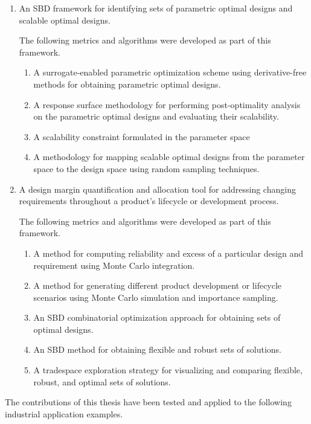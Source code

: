 \begin{enumerate}
	\item{An \ac{SBD} framework for identifying sets of parametric optimal designs and scalable optimal designs.}
	
	The following metrics and algorithms were developed as part of this framework.
	
	\begin{enumerate}
		\item{A surrogate-enabled parametric optimization scheme using derivative-free methods for obtaining parametric optimal designs.}
		\item{A response surface methodology for performing post-optimality analysis on the parametric optimal designs and evaluating their scalability.}
		\item{A scalability constraint formulated in the parameter space}
		\item{A methodology for mapping scalable optimal designs from the parameter space to the design space using random sampling techniques.}
	\end{enumerate}
	\item{A design margin quantification and allocation tool for addressing changing requirements throughout a product's lifecycle or development process.}
	
	The following metrics and algorithms were developed as part of this framework.
	
	\begin{enumerate}
		\item{A method for computing reliability and excess of a particular design and requirement using Monte Carlo integration.}
		\item{A method for generating different product development or lifecycle scenarios using Monte Carlo simulation and importance sampling.}
		\item{An \ac{SBD} combinatorial optimization approach for obtaining sets of optimal designs.}
		\item{An \ac{SBD} method for obtaining flexible and robust sets of solutions.}
		\item{A tradespace exploration strategy for visualizing and comparing flexible, robust, and optimal sets of solutions.}
	\end{enumerate}
\end{enumerate}

The contributions of this thesis have been tested and applied to the following industrial application examples.

